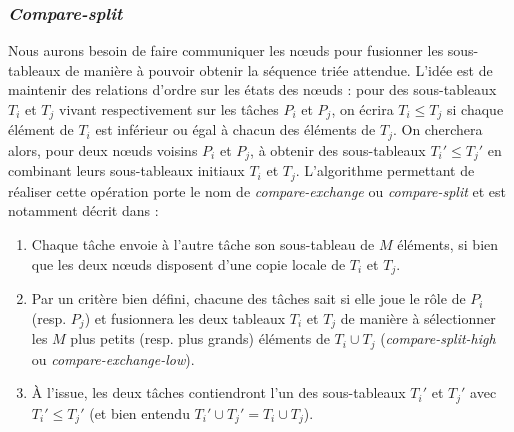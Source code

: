 \subsubsection{\textit{Compare-split}}

Nous aurons besoin de faire communiquer les nœuds pour fusionner les sous-tableaux de manière à pouvoir obtenir la séquence triée attendue. L'idée est de maintenir des relations d'ordre sur les états des nœuds : pour des sous-tableaux $T_i$ et $T_j$ vivant respectivement sur les tâches $P_i$ et $P_j$, on écrira $T_i \leq T_j$ si chaque élément de $T_i$ est inférieur ou égal à chacun des éléments de $T_j$. On cherchera alors, pour deux nœuds voisins $P_i$ et $P_j$, à obtenir des sous-tableaux $T_i' \leq T_j'$ en combinant leurs sous-tableaux initiaux $T_i$ et $T_j$. L'algorithme permettant de réaliser cette opération porte le nom de \textit{compare-exchange} ou \textit{compare-split} et est notamment décrit dans \cite{GRAMA} :

\begin{enumerate}
\item Chaque tâche envoie à l'autre tâche son sous-tableau de $M$ éléments, si bien que les deux nœuds disposent d'une copie locale de $T_i$ et $T_j$.
\item Par un critère bien défini, chacune des tâches sait si elle joue le rôle de $P_i$ (resp. $P_j$) et fusionnera les deux tableaux $T_i$ et $T_j$ de manière à sélectionner les $M$ plus petits (resp. plus grands) éléments de $T_i \cup T_j$ (\textit{compare-split-high} ou \textit{compare-exchange-low}).
\item À l'issue, les deux tâches contiendront l'un des sous-tableaux $T_i'$ et $T_j'$ avec $T_i' \leq T_j'$ (et bien entendu $T_i' \cup T_j' = T_i \cup T_j$).
\end{enumerate}

